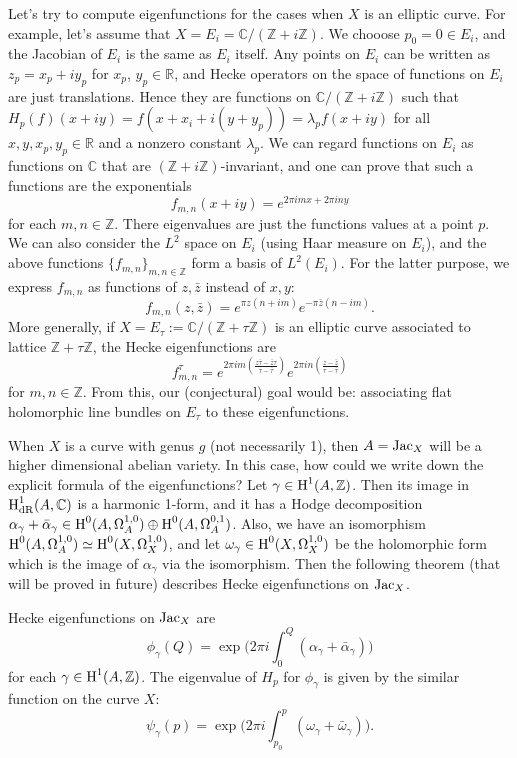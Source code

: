 Let's try to compute eigenfunctions for the cases when $X$ is an elliptic curve.
For example, let's assume that $X = E_i = \mathbb{C} / (\mathbb{Z} + i\mathbb{Z})$.
We chooose $p_0 = 0 \in E_i$, and the Jacobian of $E_i$ is the same as $E_i$ itself.
Any points on $E_i$ can be written as $z_p = x_p + iy_p$ for $x_p$, $y_p \in \mathbb{R}$, 
and Hecke operators on the space of functions on $E_i$ are just translations.
Hence they are functions on $\mathbb{C} / (\mathbb{Z} + i\mathbb{Z})$ such that 
$H_p(f)(x + iy) = f(x + x_i + i(y + y_p)) = \lambda_p f(x + iy)$ for all $x, y, x_p, y_p \in \mathbb{R}$ and a nonzero constant $\lambda_p$.
We can regard functions on $E_i$ as functions on $\mathbb{C}$ that are $(\mathbb{Z} + i\mathbb{Z})$-invariant, and 
one can prove that such a functions are the exponentials
$$
f_{m, n}(x + iy) = e^{2\pi i mx + 2\pi i ny}
$$
for each $m, n \in \mathbb{Z}$.
There eigenvalues are just the functions values at a point $p$.
We can also consider the $L^2$ space on $E_i$ (using Haar measure on $E_i$),
and the above functions $\{f_{m, n}\}_{m, n \in \mathbb{Z}}$ form a basis of $L^2(E_i)$.
For the latter purpose, we express $f_{m, n}$ as functions of $z, \bar{z}$ instead of $x, y$:
$$
f_{m,n}(z, \bar z) = e^{\pi z(n + im)}e^{-\pi \bar z (n - im)}.
$$
More generally, if $X = E_\tau:= \mathbb{C}/(\mathbb{Z} + \tau \mathbb{Z})$ is an elliptic curve associated to lattice $\mathbb{Z} + \tau\mathbb{Z}$,
the Hecke eigenfunctions are
$$
f_{m,n}^\tau = e^{2\pi i m \left(\frac{z \bar \tau - \bar z \tau}{\tau - \bar \tau}\right)} e^{2\pi i n \left(\frac{z - \bar z}{\tau - \bar \tau}\right)}
$$
for $m, n \in \mathbb{Z}$.
From this, our (conjectural) goal would be: associating flat holomorphic line bundles on $E_\tau$ to these eigenfunctions.

When $X$ is a curve with genus $g$ (not necessarily 1), 
then $A = \operatorname{\mathrm{Jac}}_X$ will be a higher dimensional abelian variety.
In this case, how could we write down the explicit formula of the eigenfunctions?
Let $\gamma \in \operatorname{\mathrm{H}}^1(A, \mathbb{Z})$.
Then its image in $\operatorname{\mathrm{H}}^1_{\mathrm{dR}}(A, \mathbb{C})$ is a harmonic 1-form, and it has a Hodge decomposition
$\alpha_\gamma +\bar\alpha_\gamma \in \operatorname{\mathrm{H}}^0(A, \Omega_A^{1, 0})\oplus \operatorname{\mathrm{H}}^0(A, \Omega_A^{0, 1})$.
Also, we have an isomorphism $\operatorname{\mathrm{H}}^0(A, \Omega^{1, 0}_A) \simeq \operatorname{\mathrm{H}}^0(X, \Omega_X^{1, 0})$, and let $\omega_\gamma \in \operatorname{\mathrm{H}}^0(X, \Omega_X^{1, 0})$
be the holomorphic form which is the image of $\alpha_\gamma$ via the isomorphism.
Then the following theorem (that will be proved in future) describes Hecke eigenfunctions on $\operatorname{\mathrm{Jac}}_X$.
\begin{theorem}
    Hecke eigenfunctions on $\operatorname{\mathrm{Jac}}_X$ are
    $$
    \phi_\gamma(Q) = \exp \bigg(2 \pi i \int_0^Q (\alpha_\gamma + \bar\alpha_\gamma)\bigg)
    $$
    for each $\gamma \in \operatorname{\mathrm{H}}^1(A, \mathbb{Z})$.
    The eigenvalue of $H_p$ for $\phi_\gamma$ is given by the similar function on the curve $X$:
    $$
    \psi_\gamma(p) = \exp \bigg(2\pi i \int_{p_0}^{p} (\omega_\gamma + \bar\omega_\gamma)\bigg).
    $$
\end{theorem}